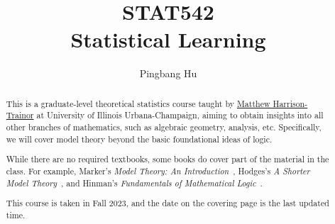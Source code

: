 \documentclass[a4paper]{report}
\author{Pingbang Hu}
\title{STAT542\\Statistical Learning}
\begin{document}
\maketitle

\begin{abstract}
  This is a graduate-level theoretical statistics course taught by \href{http://www-personal.umich.edu/~matthhar/}{Matthew Harrison-Trainor} at University of Illinois Urbana-Champaign, aiming to obtain insights into all other branches of mathematics, such as algebraic geometry, analysis, etc. Specifically, we will cover model theory beyond the basic foundational ideas of logic.

  While there are no required textbooks, some books do cover part of the material in the class. For example, Marker's \emph{Model Theory: An Introduction}~\cite{marker2002model}, Hodges's \emph{A Shorter Model Theory}~\cite{hodges1997shorter}, and Hinman's \emph{Fundamentals of Mathematical Logic}~\cite{hinman2005fundamentals}.

  \vfill
  \begin{center}
  \end{center}
  \vfill
  This course is taken in Fall 2023, and the date on the covering page is the last updated time.
\end{abstract}

\tableofcontents


\newpage
\appendix
\appendixpage{}



\newpage
\printbibliography{}
\end{document}

